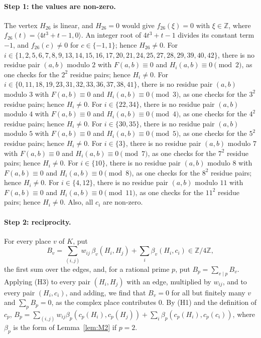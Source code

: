 \documentclass[11pt]{article}
\newcommand{\Z}{\mathbb{Z}}
\begin{document}
\paragraph{Step 1: the values are non-zero.} The vertex $H_{26}$ is linear, and $H_{26}=0$ would give $f_{26}(\xi)=0$ with $\xi\in\Z$, where $f_{26}(t)=\langle 4t^{3}+t-1,0\rangle$. An integer root of $4t^{3}+t-1$ divides its constant term $-1$, and $f_{26}(c)\neq0$ for $c\in\{-1,1\}$; hence $H_{26}\neq0$. For $i\in\{1,\allowbreak 2,\allowbreak 5,\allowbreak 6,\allowbreak 7,\allowbreak 8,\allowbreak 9,\allowbreak 13,\allowbreak 14,\allowbreak 15,\allowbreak 16,\allowbreak 17,\allowbreak 20,\allowbreak 21,\allowbreak 24,\allowbreak 25,\allowbreak 27,\allowbreak 28,\allowbreak 29,\allowbreak 39,\allowbreak 40,\allowbreak 42\}$, there is no residue pair $(a,b)$ modulo $2$ with $F(a,b)\equiv0$ and $H_i(a,b)\equiv0\pmod{2}$, as one checks for the $2^2$ residue pairs; hence $H_i\neq0$. For $i\in\{0,\allowbreak 11,\allowbreak 18,\allowbreak 19,\allowbreak 23,\allowbreak 31,\allowbreak 32,\allowbreak 33,\allowbreak 36,\allowbreak 37,\allowbreak 38,\allowbreak 41\}$, there is no residue pair $(a,b)$ modulo $3$ with $F(a,b)\equiv0$ and $H_i(a,b)\equiv0\pmod{3}$, as one checks for the $3^2$ residue pairs; hence $H_i\neq0$. For $i\in\{22,\allowbreak 34\}$, there is no residue pair $(a,b)$ modulo $4$ with $F(a,b)\equiv0$ and $H_i(a,b)\equiv0\pmod{4}$, as one checks for the $4^2$ residue pairs; hence $H_i\neq0$. For $i\in\{30,\allowbreak 35\}$, there is no residue pair $(a,b)$ modulo $5$ with $F(a,b)\equiv0$ and $H_i(a,b)\equiv0\pmod{5}$, as one checks for the $5^2$ residue pairs; hence $H_i\neq0$. For $i\in\{3\}$, there is no residue pair $(a,b)$ modulo $7$ with $F(a,b)\equiv0$ and $H_i(a,b)\equiv0\pmod{7}$, as one checks for the $7^2$ residue pairs; hence $H_i\neq0$. For $i\in\{10\}$, there is no residue pair $(a,b)$ modulo $8$ with $F(a,b)\equiv0$ and $H_i(a,b)\equiv0\pmod{8}$, as one checks for the $8^2$ residue pairs; hence $H_i\neq0$. For $i\in\{4,\allowbreak 12\}$, there is no residue pair $(a,b)$ modulo $11$ with $F(a,b)\equiv0$ and $H_i(a,b)\equiv0\pmod{11}$, as one checks for the $11^2$ residue pairs; hence $H_i\neq0$. Also, all $c_i$ are non-zero.

\paragraph{Step 2: reciprocity.} For every place $v$ of $K$, put
\begin{equation}\label{eq:B}
B_v=\sum_{(i,j)}w_{ij}\,\beta_v(H_i,H_j)+\sum_i\beta_v(H_i,c_i)\in\Z/4\Z,
\end{equation}
the first sum over the edges, and, for a rational prime $p$, put $B_p=\sum_{v\mid p}B_v$. Applying (H3) to every pair $(H_i,H_j)$ with an edge, multiplied by $w_{ij}$, and to every pair $(H_i,c_i)$, and adding, we find that $B_v=0$ for all but finitely many $v$ and $\sum_pB_p=0$, as the complex place contributes $0$. By (H1) and the definition of $c_p$, $B_p=\sum_{(i,j)}w_{ij}\beta_p(c_p(H_i),c_p(H_j))+\sum_i\beta_p(c_p(H_i),c_p(c_i))$, where $\beta_p$ is the form of Lemma~\ref{lem:M2} if $p=2$.
\end{document}
